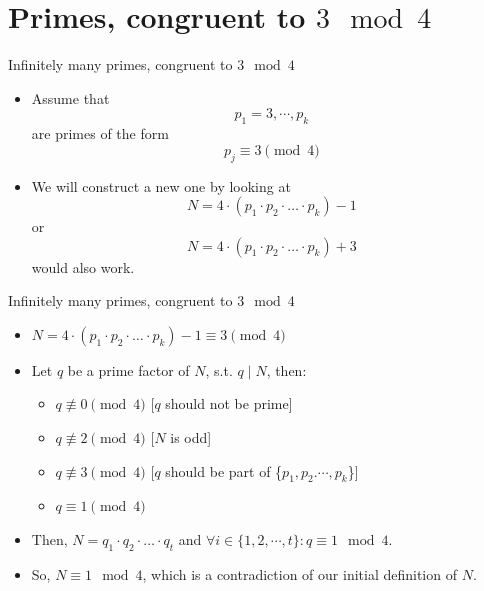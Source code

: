 \documentclass{beamer}
\begin{document}
\section{Primes, congruent to $3 \mod 4$}

\begin{frame}{Infinitely many primes, congruent to $3 \mod 4$}
    \begin{itemize}
        \item Assume that $$p_1 = 3, \cdots, p_k$$ are primes of the form $$p_j \equiv 3 \pmod 4$$
        \item We will construct a new one by looking at $$N = 4 \cdot (p_1 \cdot p_2 \cdot \ldots \cdot p_k) - 1 $$ or $$N = 4 \cdot (p_1 \cdot p_2 \cdot \ldots \cdot p_k) + 3$$ would also work.          
    \end{itemize}
\end{frame}

\begin{frame}{Infinitely many primes, congruent to $3 \mod 4$}
    \begin{itemize}
        \item $N = 4 \cdot (p_1 \cdot p_2 \cdot \ldots \cdot p_k) - 1 \equiv 3 \pmod{4}$
        \item Let $q$ be a prime factor of $N$, s.t. $q \mid N$, then:
        \begin{itemize}
            \item $q \not\equiv 0 \pmod 4$ \hspace{0.5cm} {\scriptsize [$q$ should not be prime]}
            \item $q \not\equiv 2 \pmod 4$ \hspace{0.5cm} {\scriptsize [$N$ is odd]}
            \item $q \not\equiv 3 \pmod 4$ \hspace{0.5cm} {\scriptsize [$q$ should be part of \{$p_1, p_2. \cdots, p_k$\}]}
            \item $q \equiv 1 \pmod 4$
        \end{itemize}
        \item Then, $N = q_1 \cdot q_2 \cdot \ldots \cdot q_t$ and $\forall i \in \{1,2,\cdots,t\}: q \equiv 1 \mod 4$.
        \item So, $N \equiv 1 \mod 4$, which is a contradiction of our initial definition of $N$.
    \end{itemize}
\end{frame}
\end{document}
